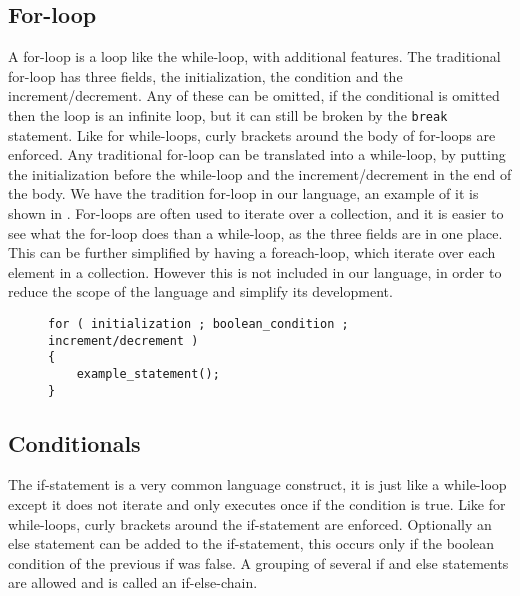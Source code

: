 \subsection{For-loop}
A for-loop is a loop like the while-loop, with additional features. 
The traditional for-loop has three fields, the initialization, the condition and the increment/decrement. 
Any of these can be omitted, if the conditional is omitted then the loop is an infinite loop, but it can still be broken by the \texttt{break} statement.
Like for while-loops, curly brackets around the body of for-loops are enforced. 
Any traditional for-loop can be translated into a while-loop, by putting the initialization before the while-loop and the increment/decrement in the end of the body. 
We have the tradition for-loop in our language, an example of it is shown in . 
For-loops are often used to iterate over a collection, and it is easier to see what the for-loop does than a while-loop, as the three fields are in one place. 
This can be further simplified by having a foreach-loop, which iterate over each element in a collection.
However this is not included in our language, in order to reduce the scope of the language and simplify its development. 
\begin{figure}[h]
\begin{lstlisting}[caption=An example of a for-loop, label=lst:forExample]
for ( initialization ; boolean_condition ; increment/decrement )
{
    example_statement();
}
\end{lstlisting}
\end{figure}


\subsection{Conditionals}
The if-statement is a very common language construct, it is just like a while-loop except it does not iterate and only executes once if the condition is true.
Like for while-loops, curly brackets around the if-statement are enforced. 
Optionally an else statement can be added to the if-statement, this occurs only if the boolean condition of the previous if was false. 
A grouping of several if and else statements are allowed and is called an if-else-chain. 

